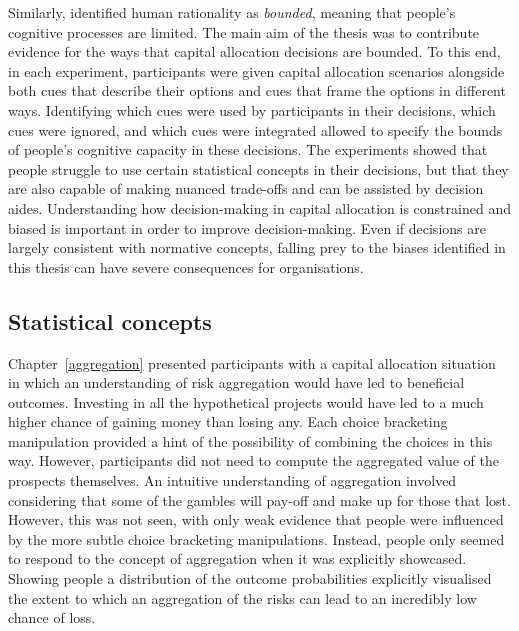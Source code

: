 \documentclass[a4paper, nobind, dvipsnames]{templates/ociamthesis}
\theoremstyle{definition}
\theoremstyle{definition}
\theoremstyle{definition}
\theoremstyle{definition}
\theoremstyle{remark}
\begin{document}
Similarly, \textcite{simon1955} identified human rationality as \emph{bounded}, meaning that
people's cognitive processes are limited. The main aim of the thesis was to
contribute evidence for the ways that capital allocation decisions are bounded.
To this end, in each experiment, participants were given capital allocation
scenarios alongside both cues that describe their options and cues that frame
the options in different ways. Identifying which cues were used by participants
in their decisions, which cues were ignored, and which cues were integrated
allowed to specify the bounds of people's cognitive capacity in these decisions.
The experiments showed that people struggle to use certain statistical concepts
in their decisions, but that they are also capable of making nuanced trade-offs
and can be assisted by decision aides. Understanding how decision-making in
capital allocation is constrained and biased is important in order to improve
decision-making. Even if decisions are largely consistent with normative
concepts, falling prey to the biases identified in this thesis can have severe
consequences for organisations.

\subsection{Statistical concepts}

Chapter~\ref{aggregation} presented participants with a capital allocation
situation in which an understanding of risk aggregation would have led to
beneficial outcomes. Investing in all the hypothetical projects would have led
to a much higher chance of gaining money than losing any. Each choice bracketing
manipulation provided a hint of the possibility of combining the choices in this
way. However, participants did not need to compute the aggregated value of the
prospects themselves. An intuitive understanding of aggregation involved
considering that some of the gambles will pay-off and make up for those that
lost. However, this was not seen, with only weak evidence that people were
influenced by the more subtle choice bracketing manipulations. Instead, people
only seemed to respond to the concept of aggregation when it was explicitly
showcased. Showing people a distribution of the outcome probabilities explicitly
visualised the extent to which an aggregation of the risks can lead to an
incredibly low chance of loss.
\end{document}
